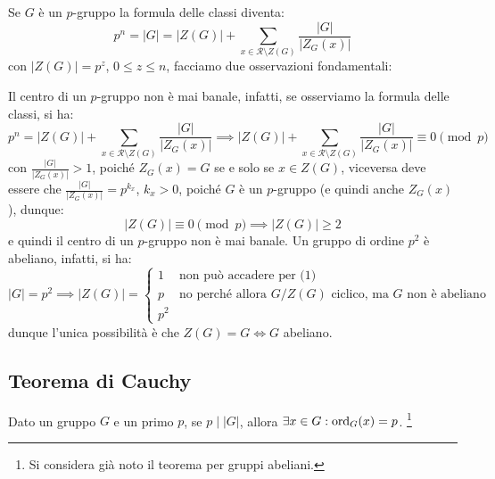 \documentclass[11pt]{scrartcl}
\begin{document}
Se $G$ è un $p$-gruppo la formula delle classi diventa:
    \[ p^n = |G| = |Z(G)| + \sum_{x \in \mathcal{R}\setminus Z(G)} \frac{|G|}{|Z_G(x)|}
        \]
con $|Z(G)| = p^z$, $0 \leq z \leq n$, facciamo due osservazioni fondamentali:
    \begin{enumerate}[(1)]
        \ii Il centro di un $p$-gruppo non è mai banale, infatti, se osserviamo la formula delle classi, si ha:
            \[ p^n = |Z(G)| +  \sum_{x \in \mathcal{R}\setminus Z(G)} \frac{|G|}{|Z_G(x)|} \implies
             |Z(G)| +  \sum_{x \in \mathcal{R}\setminus Z(G)}\frac{|G|}{|Z_G(x)|} \equiv 0 \pmod p
                \]
            con $\displaystyle \frac{|G|}{|Z_G(x)|} > 1$, poiché $Z_G(x) = G$ se e solo se $x \in Z(G)$,
            viceversa deve essere che $\displaystyle \frac{|G|}{|Z_G(x)|} = p^{k_x}$, $k_x>0$, poiché $G$ è un $p$-gruppo (e quindi anche $Z_G(x)$), dunque:
                \[ |Z(G)| \equiv 0 \pmod p \implies |Z(G)| \geq 2
                    \]
            e quindi il centro di un $p$-gruppo non è mai banale.
        \ii Un gruppo di ordine $p^2$ è abeliano, infatti, si ha:
            \[ |G| = p^2 \implies |Z(G)| = \begin{cases}
                                                1 &\text{non può accadere per (1)} \\
                                                p &\text{no perché allora $G/Z(G)$ ciclico, ma $G$ non è abeliano}\\
                                                p^2
                                            \end{cases}
                \]
            dunque l'unica possibilità è che $Z(G) = G \iff G$ abeliano.
    \end{enumerate}

\newpage
\subsection{Teorema di Cauchy}

\begin{theorem}
    \label{p:Cauchy}
    Dato un gruppo $G$ e un primo $p$, se $p \mid |G|$, allora $\exists x \in G : \operatorname{ord}_G(x) = p$. \footnote{Si considera già noto il teorema per gruppi abeliani.}
\end{theorem}
\end{document}
